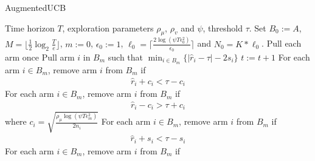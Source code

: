 \begin{algorithm}[th!]
\caption{AugmentedUCB}
\label{alg:augucb}
\begin{algorithmic}
 Time horizon $T$, exploration parameters $\rho_{\mu}$, $\rho_v$ and $\psi$, threshold $\tau$.
 Set $B_{0}:=A$, $M=\bigg\lfloor \frac{1}{2}\log_{2} \frac{T}{e}\bigg\rfloor $, $m:=0$, $\epsilon_{0}:=1$, $\ell_{0}=\big\lceil \frac{2\log(\psi T\epsilon_{0}^{2})}{\epsilon_{0}} \big\rceil$ and $N_{0}=K*\ell_{0} $.
\State Pull each arm once
\State {}
\State Pull arm $i$ in $B_m$ such that $\min_{i\in B_{m}}\bigg\lbrace |\hat{r}_{i} - \tau | - 2s_{i}\bigg\rbrace$
\State $t:=t+1$ 
\ArmElim
\State For each arm $i \in B_{m}$, remove arm ${i}$ from $B_{m}$ if
\begin{align*}
\hat{r}_{i} + c_i  < \tau - c_i
\end{align*}
\State For each arm $i \in B_{m}$, remove arm ${i}$ from $B_{m}$ if
\begin{align*}
\hat{r}_{i} - c_i  > \tau + c_i
\end{align*}
where $ c_i=\sqrt{\frac{\rho_{\mu}\log{(\psi T\epsilon_{m}^{2})}}{2 n_{i}}} $
\EndArmElim
\ArmElimV
\State For each arm $i \in B_{m}$, remove arm ${i}$ from $B_{m}$ if
\begin{align*}
\hat{r}_{i} + s_i  < \tau - s_i 
\end{align*}
\State For each arm $i \in B_{m}$, remove arm ${i}$ from $B_{m}$ if
\begin{align*}

\end{align*}
\end{algorithmic}
\end{algorithm}
